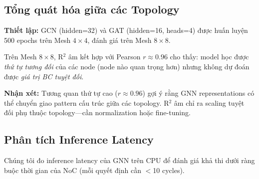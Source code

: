 \documentclass[conference]{IEEEtran}
\begin{document}
\subsection{Tổng quát hóa giữa các Topology}

\textbf{Thiết lập:} GCN (hidden=32) và GAT (hidden=16, heads=4) được
huấn luyện 500 epochs trên Mesh $4\times4$, đánh giá trên Mesh $8\times8$.

\begin{table}[h]
\centering
\caption{Dự đoán BC qua các topology (huấn luyện trên Mesh $4\times4$)}
\label{tab:generalization}
\end{table}

Trên Mesh $8\times8$, R$^2$ âm kết hợp với Pearson $r \approx 0.96$
cho thấy: model học được \emph{thứ tự tương đối} của các node (node nào
quan trọng hơn) nhưng không dự đoán được \emph{giá trị BC tuyệt đối}.

\textbf{Nhận xét:} Tương quan thứ tự cao ($r\approx0.96$) gợi ý rằng
GNN representations có thể chuyển giao pattern cấu trúc giữa các topology.
R$^2$ âm chỉ ra scaling tuyệt đối phụ thuộc topology---cần normalization
hoặc fine-tuning.

\subsection{Phân tích Inference Latency}

Chúng tôi đo inference latency của GNN trên CPU để đánh giá khả thi
dưới ràng buộc thời gian của NoC (mỗi quyết định cần $<$10 cycles).

\begin{table}[h]
\centering
\caption{Inference latency GNN trên CPU (Python/PyTorch)}
\label{tab:latency}
\end{table}
\end{document}
